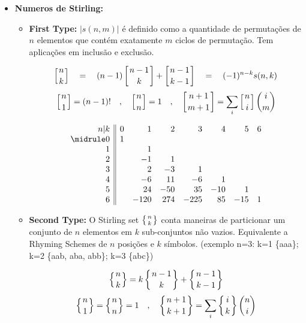 \begin{small}
\begin{itemize}
    \item \textbf{Numeros de Stirling:}
    \begin{itemize}
        \item \textbf{First Type:} 
         $|s(n,m)|$ é definido como a quantidade de permutações de $n$ elementos que contém exatamente $m$ ciclos de permutação. Tem aplicações em inclusão e exclusão.
        
        \[
        \left[{n \atop k}\right]  \quad=\quad 
        (n-1) \left[{ n-1 \atop k }\right] + \left[{n-1 \atop k-1}\right] 
        \quad=\quad (-1)^{n-k}s(n,k)
        \]
        \[
        \left[{n \atop 1}\right] = (n-1)! \quad , \quad
        \left[{n \atop n}\right] = 1 \quad , \quad
        \left[{n+1 \atop m+1}\right] = \sum_{i} \left[{n \atop i}\right] \binom{i}{m}
        \]
        
        \[\begin{array}{r||rrrrrrr}
        n|k & 0 & 1 & 2 & 3 & 4 & 5 & 6   \\\midrule
        0 & 1 &      &     &     &     &     &   \\
        1 &   & 1    &     &     &     &     &   \\
        2 &   & -1   & 1   &     &     &     &   \\
        3 &   & 2    & -3  & 1   &     &     &   \\
        4 &   & -6   & 11  & -6  & 1   &     &   \\
        5 &   & 24   & -50 & 35  & -10 & 1   &   \\
        6 &   & -120 & 274 & -225& 85  & -15 & 1 \\
        \end{array}\]
        
        
        \item \textbf{Second Type:} O Stirling set 
        ${\left\{{n \atop k}\right\}}$ conta maneiras de  particionar um conjunto de $n$ elementos em $k$ sub-conjuntos não vazios. 
        Equivalente a Rhyming Schemes de $n$ posições e $k$ símbolos. (exemplo n=3: k=1 \{aaa\}; k=2 \{aab, aba, abb\}; k=3 \{abc\})
        
        \[
        \left\{{n \atop k}\right\}  =
        k \left\{{n-1 \atop k}\right\} + \left\{{n-1 \atop k-1}\right\}
        \]
        \[
        \left\{{n \atop 1}\right\} = \left\{{n \atop n}\right\} = 1 \quad , \quad
        \left\{{n+1 \atop k+1}\right\} = \sum_{i} \left\{{i \atop k}\right\} \binom{n}{i}
        \]
        

\end{itemize}
\end{itemize}
\end{small}
